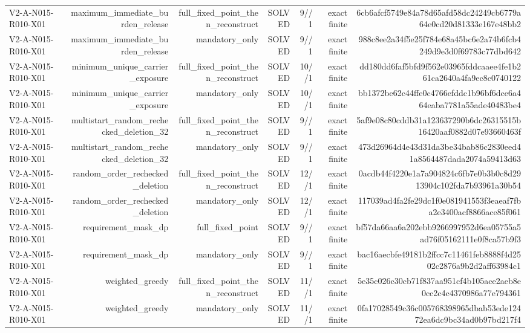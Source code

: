 {\begin{longtable}{lrrrrrr}
V2-A-N015-R010-X01 & maximum\_immediate\_burden\_release & full\_fixed\_point\_then\_reconstruct & SOLVED & 9//1 & exact finite & 6cb6afcf5749e84a78d65afd58dc24249cb6779a64e0cd20d81333e167e48bb2 \\
V2-A-N015-R010-X01 & maximum\_immediate\_burden\_release & mandatory\_only & SOLVED & 9//1 & exact finite & 988c8ee2a34f5e25f784e68a45bc6e2a74b6fcb4249d9e3d0f69783c77dbd642 \\
V2-A-N015-R010-X01 & minimum\_unique\_carrier\_exposure & full\_fixed\_point\_then\_reconstruct & SOLVED & 10//1 & exact finite & dd180dd6faf5bfd9f562e03965fddcaaee4fe1b261ca2640a4fa9ec8c0740122 \\
V2-A-N015-R010-X01 & minimum\_unique\_carrier\_exposure & mandatory\_only & SOLVED & 10//1 & exact finite & bb1372be62c44ffe0c4766efddc1b96bf6dce6a464eaba7781a55ade40483be4 \\
V2-A-N015-R010-X01 & multistart\_random\_rechecked\_deletion\_32 & full\_fixed\_point\_then\_reconstruct & SOLVED & 9//1 & exact finite & 5af9e08c80cddb31a123637290b6dc26315515b16420aaf0882d07e93660463f \\
V2-A-N015-R010-X01 & multistart\_random\_rechecked\_deletion\_32 & mandatory\_only & SOLVED & 9//1 & exact finite & 473d26964d4e43d31da3be34bab86c2830eed41a8564487dada2074a59413d63 \\
V2-A-N015-R010-X01 & random\_order\_rechecked\_deletion & full\_fixed\_point\_then\_reconstruct & SOLVED & 12//1 & exact finite & 0acdb44f4220e1a7a904824c6fb7e0b3b0c8d2913904c102fda7b93961a30b54 \\
V2-A-N015-R010-X01 & random\_order\_rechecked\_deletion & mandatory\_only & SOLVED & 12//1 & exact finite & 117039ad4fa2fe29dc1f0e081941553f3eaeaf7fba2e3400acf8866ace85f061 \\
V2-A-N015-R010-X01 & requirement\_mask\_dp & full\_fixed\_point & SOLVED & 9//1 & exact finite & bf57da66aa6a202ebb9266997952d6ea05755a5ad76f05162111e0f8ca57b9f3 \\
V2-A-N015-R010-X01 & requirement\_mask\_dp & mandatory\_only & SOLVED & 9//1 & exact finite & bac16aecbfe49181b2ffcc7c11461feb8888f4d2502c2876a9b2d2aff63984c1 \\
V2-A-N015-R010-X01 & weighted\_greedy & full\_fixed\_point\_then\_reconstruct & SOLVED & 11//1 & exact finite & 5e35c026c30cb71f837aa951cf4b105ace2aeb8e0cc2c4c4370986a77e794361 \\
V2-A-N015-R010-X01 & weighted\_greedy & mandatory\_only & SOLVED & 11//1 & exact finite & 0fa17028549c36c005768398965dbab53ede12472ea6dc9bc34ad0b97bd217f4 \\

\end{longtable}}
